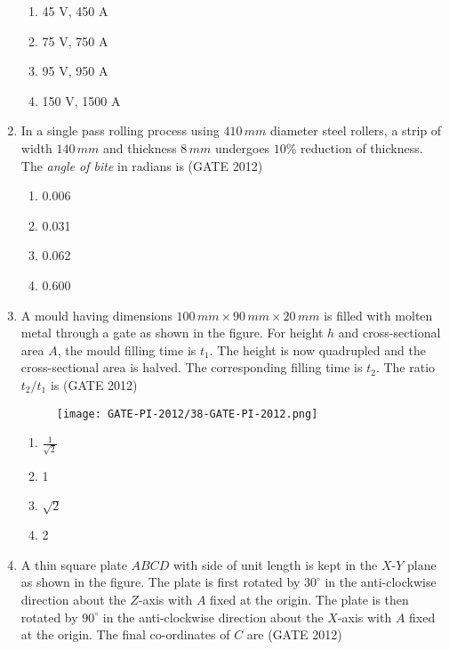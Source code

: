 \documentclass[journal,12pt,onecolumn]{IEEEtran}
\theoremstyle{remark}
\begin{document}
\begin{enumerate}
\begin{enumerate}
\item 45 V, 450 A
\item 75 V, 750 A
\item 95 V, 950 A
\item 150 V, 1500 A
\end{enumerate}
\vspace{1cm}

\item In a single pass rolling process using $410 \, mm$ diameter steel rollers, a strip of width $140 \, mm$ and thickness $8 \, mm$ undergoes $10\%$ reduction of thickness. The \textit{angle of bite} in radians is
\hfill{(GATE 2012)}

\begin{enumerate}
\item 0.006
\item 0.031
\item 0.062
\item 0.600
\end{enumerate}
\vspace{1cm}

\item A mould having dimensions $100 \, mm \times 90 \, mm \times 20 \, mm$ is filled with molten metal through a gate as shown in the figure. For height $h$ and cross-sectional area $A$, the mould filling time is $t_1$. The height is now quadrupled and the cross-sectional area is halved. The corresponding filling time is $t_2$. The ratio $t_2/t_1$ is
\hfill{(GATE 2012)}

\begin{figure}[h!]
\centering
\texttt{[image: GATE-PI-2012/38-GATE-PI-2012.png]}
\caption{}
\label{q38}
\end{figure}

\begin{enumerate}
\item $\tfrac{1}{\sqrt{2}}$
\item 1
\item $\sqrt{2}$
\item 2
\end{enumerate}
\vspace{1cm}

\item A thin square plate $ABCD$ with side of unit length is kept in the $X$-$Y$ plane as shown in the figure. The plate is first rotated by $30^\circ$ in the anti-clockwise direction about the $Z$-axis with $A$ fixed at the origin. The plate is then rotated by $90^\circ$ in the anti-clockwise direction about the $X$-axis with $A$ fixed at the origin. The final co-ordinates of $C$ are
\hfill{(GATE 2012)}


\end{enumerate}
\end{document}
